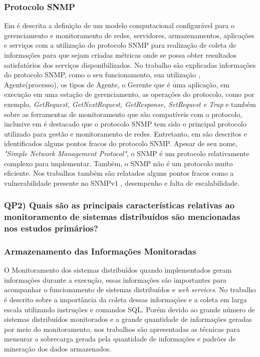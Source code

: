 \subsubsection{Protocolo SNMP}
\label{snmpDescription}

Em \cite{deGeus} é descrita a definição de um modelo computacional configurável para o gerenciamento e monitoramento de redes, servidores, armazenamentos, aplicações e serviços com a utilização do protocolo SNMP para realização de coleta de informações para que sejam criadas métricas onde se possa obter resultados satisfatórios dos serviços disponibilizados. No  trabalho \cite{daSilva} são explicadas informações do protocolo SNMP, como o seu funcionamento, sua utilização , Agente(processo), os tipos de Agente, o Gerente que é uma aplicação, em execução em uma estação de gerenciamento, as operações do protocolo, como por exemplo, \textit{GetRequest, 	GetNextRequest,  GetResponse,  SetRequest  e Trap} e também sobre as ferramentas de monitoramento que são compatíveis com o protocolo, inclusive em \cite{Fraga} é destacado que o protocolo SNMP tem sido o principal protocolo utilizado para gestão e monitoramento de redes. Entretanto, em \cite{deMello} são descritos e identificados alguns pontos fracos do protocolo \acrshort{SNMP}. Apesar  de  seu  nome,  \textit{"Simple  Network  Management  Protocol"},  o  SNMP  é  um protocolo  relativamente  complexo  para  implementar.  Também,  o  SNMP  não  é  um protocolo muito eficiente. Nos trabalhos \cite{phan2009cryptanalysis,subramanyan2000scalable} também são relatados alguns pontos fracos como a vulnerabilidade presente no SNMPv1 , desempenho e falta de escalabilidade.

\subsubsection{QP2) Quais são as principais características relativas ao monitoramento de sistemas distribuídos são mencionadas nos estudos primários?}

\subsubsection{Armazenamento das Informações Monitoradas}

O Monitoramento dos sistemas distribuídos quando implementados geram informações durante a execução, essas informações são importantes para acompanhar o funcionamento de sistemas distribuídos e \textit{web services}. No trabalho \cite{phan2009cryptanalysis} é descrito sobre a importância da coleta dessas informações e a coleta em larga escala utilizando instruções e comandos SQL. Porém devido ao grande número de sistemas distribuídos monitorados e a grande quantidade de informações geradas por meio do monitoramento, nos trabalhos \cite{abdu1996monitoring,hirate2009profiling} são apresentadas as técnicas para mensurar a sobrecarga gerada pela quantidade de informações e padrões de mineração dos dados armazenados.  

